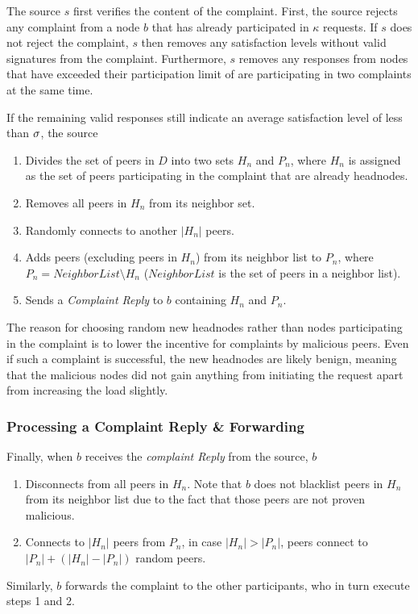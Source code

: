 The source $s$ first verifies the content of the complaint. First, the source rejects any complaint from a node $b$ that has already participated in $\kappa$ requests. 
If $s$ does not reject the complaint, $s$ then removes any satisfaction levels without valid signatures from the complaint.
Furthermore, $s$ removes any responses from nodes that have exceeded their participation limit of are participating in two complaints at the same time. 

If the remaining valid responses still indicate an average satisfaction level of less than $\sigma$, the source 
\begin{enumerate}
 \item Divides the set of peers in $D$ into two sets $H_n$ and $P_n$, where $H_n$ is assigned as the set of peers participating in the complaint that are already headnodes. 
 \item Removes all peers in $H_n$ from its neighbor set.
 \item Randomly connects to another $|H_n|$ peers. 
 \item Adds peers (excluding peers in $H_n$) from its neighbor list to $P_n$, where $P_n = NeighborList\setminus H_n$ ($NeighborList$ is the set of peers in a neighbor list). 
 \item Sends a \textit{Complaint Reply} to $b$ containing $H_n$ and $P_n$.
\end{enumerate}
 The reason for choosing random new headnodes rather than nodes participating in the complaint is to lower the incentive for complaints by malicious peers. Even if such a complaint is successful, the new headnodes are likely benign, meaning that the malicious nodes did not gain anything from initiating the request apart from increasing the load slightly. 


\subsubsection*{Processing a Complaint Reply \& Forwarding}

Finally, when $b$ receives the \textit{complaint Reply} from the source, $b$ 
\begin{enumerate}
 \item Disconnects from all peers in $H_n$. Note that $b$ does not blacklist peers in $H_n$ from its neighbor list due to the fact that those peers are not proven malicious.
 \item Connects to $|H_n|$ peers from $P_n$, in case $|H_n|>|P_n|$, peers connect to $|P_n|+(|H_n|-|P_n|)$ random peers.
\end{enumerate}
Similarly, $b$ forwards the complaint to the other participants, who in turn execute steps 1 and 2.

